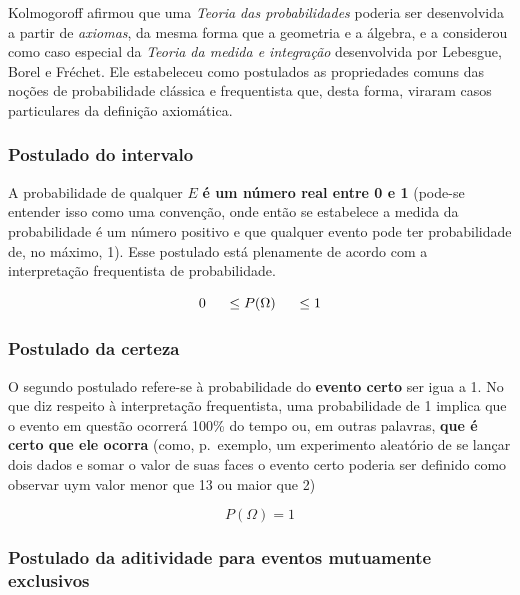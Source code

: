 \documentclass[
]{book}
\begin{document}
\hfill\break

Kolmogoroff afirmou que uma \emph{Teoria das probabilidades} poderia ser desenvolvida a partir de \emph{axiomas}, da
mesma forma que a geometria e a álgebra, e a considerou como caso especial da \emph{Teoria da medida e integração} desenvolvida por Lebesgue, Borel e Fréchet. Ele estabeleceu como postulados as propriedades comuns das noções de probabilidade clássica e frequentista que, desta forma, viraram casos particulares da definição axiomática.

\hfill\break

\hypertarget{postulado-do-intervalo}{%
\subsubsection{Postulado do intervalo}\label{postulado-do-intervalo}}

A probabilidade de qualquer \(E\) \textbf{é um número real entre 0 e 1} (pode-se entender isso como uma convenção, onde então se estabelece a medida da probabilidade é um número positivo e que qualquer evento pode ter probabilidade de, no máximo, 1). Esse postulado está plenamente de acordo com a interpretação frequentista de probabilidade.

\hfill\break

\[
0 \hspace{0.5cm} \le P(\Omega) \hspace{0.5cm} \le 1
\]

\hfill\break

\hypertarget{postulado-da-certeza}{%
\subsubsection{Postulado da certeza}\label{postulado-da-certeza}}

O segundo postulado refere-se à probabilidade do \textbf{evento certo} ser igua a 1. No que diz respeito à interpretação frequentista, uma probabilidade de 1 implica que o evento em questão ocorrerá 100\% do tempo ou, em outras palavras, \textbf{que é certo que ele ocorra} (como, p.~exemplo, um experimento aleatório de se lançar dois dados e somar o valor de suas faces o evento certo poderia ser definido como observar uym valor menor que 13 ou maior que 2)

\hfill\break

\[
P(\Omega) = 1
\]

\hfill\break

\hypertarget{postulado-da-aditividade-para-eventos-mutuamente-exclusivos}{%
\subsubsection{Postulado da aditividade para eventos mutuamente exclusivos}\label{postulado-da-aditividade-para-eventos-mutuamente-exclusivos}}
\end{document}
